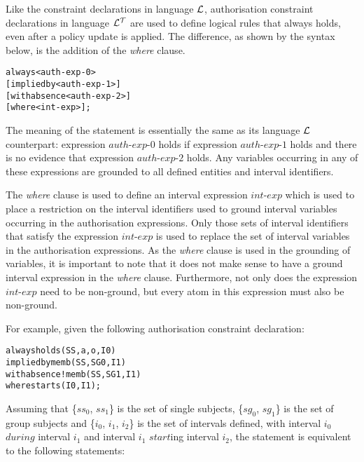 \documentclass[11pt]{report}
\newenvironment{vverbatim}
{
  \begin{alltt}
}
{
  \vspace{-\baselineskip}
  \end{alltt}
}
\begin{document}
          Like the constraint declarations in language ${\cal L}$,
          authorisation constraint declarations in language ${\cal L^T}$ are
          used to define logical rules that always holds, even after a policy
          update is applied. The difference, as shown by the syntax below, is
          the addition of the {\em where} clause.

          \begin{vverbatim}
  always <auth-exp-0>
    [implied by <auth-exp-1>]
    [with absence <auth-exp-2>]
    [where <int-exp>];
          \end{vverbatim}

          The meaning of the statement is essentially the same as its language
          ${\cal L}$ counterpart: expression $auth$-$exp$-$0$ holds if
          expression $auth$-$exp$-$1$ holds and there is no evidence that
          expression $auth$-$exp$-$2$ holds. Any variables occurring in
          any of these expressions are grounded to all defined entities and
          interval identifiers.

          The {\em where} clause is used to define an interval expression
          $int$-$exp$ which is used to place a restriction on the interval
          identifiers used to ground interval variables occurring in the
          authorisation expressions. Only those sets of interval identifiers
          that satisfy the expression $int$-$exp$ is used to replace the
          set of interval variables in the authorisation expressions. As the
          {\em where} clause is used in the grounding of variables, it is
          important to note that it does not make sense to have a ground
          interval expression in the {\em where} clause. Furthermore, not only
          does the expression $int$-$exp$ need to be non-ground, but every atom
          in this expression must also be non-ground.

          For example, given the following authorisation constraint
          declaration:

          \begin{vverbatim}
  always holds(SS, a, o, I0)
    implied by memb(SS, SG0, I1)
    with absence !memb(SS, SG1, I1)
    where starts(I0, I1);
          \end{vverbatim}

          \noindent
          Assuming that \{$ss_0$, $ss_1$\} is the set of single subjects,
          \{$sg_0$, $sg_1$\} is the set of group subjects and \{$i_0$, $i_1$,
          $i_2$\} is the set of intervals defined, with interval $i_0$ $during$
          interval $i_1$ and interval $i_1$ $start$ing interval $i_2$, the
          statement is equivalent to the following statements:
\end{document}
